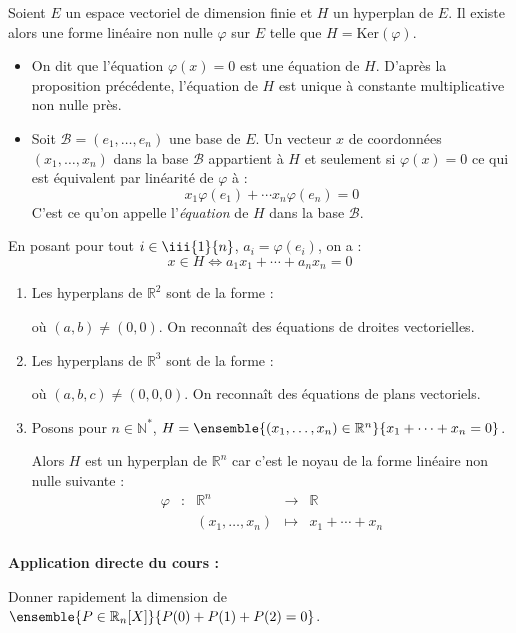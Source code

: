 \documentclass[french,11pt,twoside]{VcCours}
\newenvironment{ApplicationDirecte}{\textbf{Application directe du cours :}

}{}
\begin{document}
\newpage

\begin{TheoremeDefinition}{} Soient $E$ un espace vectoriel de dimension finie et $H$ un hyperplan de $E$. Il existe alors une forme linéaire non nulle $\varphi$ sur $E$ telle que $H = \textrm{Ker}(\varphi)$. 

\begin{itemize}
\item On dit que l'équation $\varphi(x)=0$ est une équation de $H$. D'après la proposition précédente, l'équation de $H$ est unique à constante multiplicative non nulle près.
\item Soit $\mathcal{B}=(e_1, \ldots, e_n)$ une base de $E$. Un vecteur $x$ de coordonnées $(x_1, \ldots, x_n)$ dans la base $\mathcal{B}$ appartient à $H$ et seulement si $\varphi(x)=0$ ce qui est équivalent par linéarité de $\varphi$ à :
$$x_1 \varphi(e_1) + \cdots x_n \varphi(e_n) = 0$$
C'est ce qu'on appelle l'\emph{équation} de $H$ dans la base $\mathcal{B}$.
\end{itemize}
\end{TheoremeDefinition}

\begin{Remarque}{} En posant pour tout $i \in \iii{1}{n}$, $a_i = \varphi(e_i)$, on a :
$$ x \in H \Longleftrightarrow a_1 x_1 + \cdots + a_n x_n = 0$$
\end{Remarque}

\begin{Exemples}
\begin{enumerate}
\item Les hyperplans de $\mathbb{R}^2$ sont de la forme :

\vspace{1cm}

où $(a,b) \neq (0,0)$. On reconnaît des équations de droites vectorielles.
\item  Les hyperplans de $\mathbb{R}^3$ sont de la forme :

\vspace{1cm}
où $(a,b,c) \neq (0,0,0)$. On reconnaît des équations de plans vectoriels.
\item Posons pour $n \in \mathbb{N}^*$, 
$H = \ensemble{(x_1, \ldots, x_n) \in \mathbb{R}^n}{x_1 + \cdots + x_n = 0}$.

Alors $H$ est un hyperplan de $\mathbb{R}^n$ car c'est le noyau de la forme linéaire non nulle suivante :
$$ \begin{array}{ccccl}
\varphi & : & \mathbb{R}^n  & \rightarrow & \mathbb{R} \\
& & (x_1, \ldots, x_n) & \mapsto &  x_1 + \cdots + x_n \\
\end{array}$$
\end{enumerate}
\end{Exemples}

\begin{ApplicationDirecte} 
	Donner rapidement la dimension de 
	$\ensemble{P \in \mathbb{R}_n[X]}{P(0)+P(1)+P(2)= 0}$.
\end{ApplicationDirecte}
\end{document}
